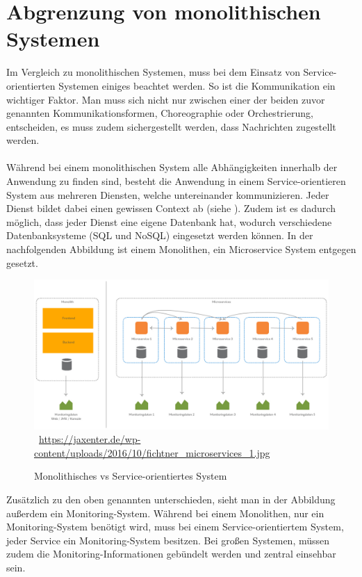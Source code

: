 \section{Abgrenzung von monolithischen Systemen}
\label{sec:AbgrenzungVonMonolithischenSystemen}
Im Vergleich zu monolithischen Systemen, muss bei dem Einsatz von Service-orientierten Systemen einiges beachtet werden. So ist die Kommunikation ein wichtiger Faktor. Man muss sich nicht nur zwischen einer der beiden zuvor genannten Kommunikationsformen, Choreographie oder Orchestrierung, entscheiden, es muss zudem sichergestellt werden, dass Nachrichten zugestellt werden.
\\\\
Während bei einem monolithischen System alle Abhängigkeiten innerhalb der Anwendung zu finden sind, besteht die Anwendung in einem Service-orientieren System aus mehreren Diensten, welche untereinander kommunizieren. Jeder Dienst bildet dabei einen gewissen Context ab (siehe ). Zudem ist es dadurch möglich, dass jeder Dienst eine eigene Datenbank hat, wodurch verschiedene Datenbanksysteme (SQL und NoSQL) eingesetzt werden können. In der nachfolgenden Abbildung ist einem Monolithen, ein Microservice System entgegen gesetzt.
\begin{figure}[htb]
    \centering 
    \includegraphics[width=\linewidth]{content/images/fichtner_microservices_1}\
    \quelle\url{https://jaxenter.de/wp-content/uploads/2016/10/fichtner_microservices_1.jpg}
    \caption{Monolithisches vs Service-orientiertes System}
    \label{fig:BoundedContext}  
\end{figure}
Zusätzlich zu den oben genannten unterschieden, sieht man in der Abbildung außerdem ein Monitoring-System. Während bei einem Monolithen, nur ein Monitoring-System benötigt wird, muss bei einem Service-orientiertem System, jeder Service ein Monitoring-System besitzen. Bei großen Systemen, müssen zudem die Monitoring-Informationen gebündelt werden und zentral einsehbar sein.